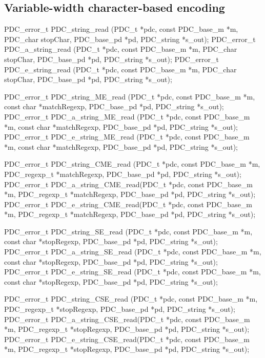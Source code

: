 \subsection{Variable-width character-based encoding}

\aedBegin{}
\aedEnd{}

\begin{tinycodeaux}{\leftmargin=0in}
PDC_error_t PDC_string_read      (PDC_t *pdc, const PDC_base_m *m, PDC_char stopChar,
			          PDC_base_pd *pd, PDC_string *s_out);
PDC_error_t PDC_a_string_read    (PDC_t *pdc, const PDC_base_m *m, PDC_char stopChar,
			          PDC_base_pd *pd, PDC_string *s_out);
PDC_error_t PDC_e_string_read    (PDC_t *pdc, const PDC_base_m *m, PDC_char stopChar,
			          PDC_base_pd *pd, PDC_string *s_out);

PDC_error_t PDC_string_ME_read   (PDC_t *pdc, const PDC_base_m *m, const char *matchRegexp,
				  PDC_base_pd *pd, PDC_string *s_out);
PDC_error_t PDC_a_string_ME_read (PDC_t *pdc, const PDC_base_m *m, const char *matchRegexp,
				  PDC_base_pd *pd, PDC_string *s_out);
PDC_error_t PDC_e_string_ME_read (PDC_t *pdc, const PDC_base_m *m, const char *matchRegexp,
				  PDC_base_pd *pd, PDC_string *s_out);

PDC_error_t PDC_string_CME_read  (PDC_t *pdc, const PDC_base_m *m, PDC_regexp_t *matchRegexp,
				  PDC_base_pd *pd, PDC_string *s_out);
PDC_error_t PDC_a_string_CME_read(PDC_t *pdc, const PDC_base_m *m, PDC_regexp_t *matchRegexp,
				  PDC_base_pd *pd, PDC_string *s_out);
PDC_error_t PDC_e_string_CME_read(PDC_t *pdc, const PDC_base_m *m, PDC_regexp_t *matchRegexp,
				  PDC_base_pd *pd, PDC_string *s_out);

PDC_error_t PDC_string_SE_read   (PDC_t *pdc, const PDC_base_m *m, const char *stopRegexp,
				  PDC_base_pd *pd, PDC_string *s_out);
PDC_error_t PDC_a_string_SE_read (PDC_t *pdc, const PDC_base_m *m, const char *stopRegexp,
				  PDC_base_pd *pd, PDC_string *s_out);
PDC_error_t PDC_e_string_SE_read (PDC_t *pdc, const PDC_base_m *m, const char *stopRegexp,
				  PDC_base_pd *pd, PDC_string *s_out);

PDC_error_t PDC_string_CSE_read  (PDC_t *pdc, const PDC_base_m *m, PDC_regexp_t *stopRegexp,
				  PDC_base_pd *pd, PDC_string *s_out);
PDC_error_t PDC_a_string_CSE_read(PDC_t *pdc, const PDC_base_m *m, PDC_regexp_t *stopRegexp,
				  PDC_base_pd *pd, PDC_string *s_out);
PDC_error_t PDC_e_string_CSE_read(PDC_t *pdc, const PDC_base_m *m, PDC_regexp_t *stopRegexp,
				  PDC_base_pd *pd, PDC_string *s_out);
\end{tinycodeaux}

